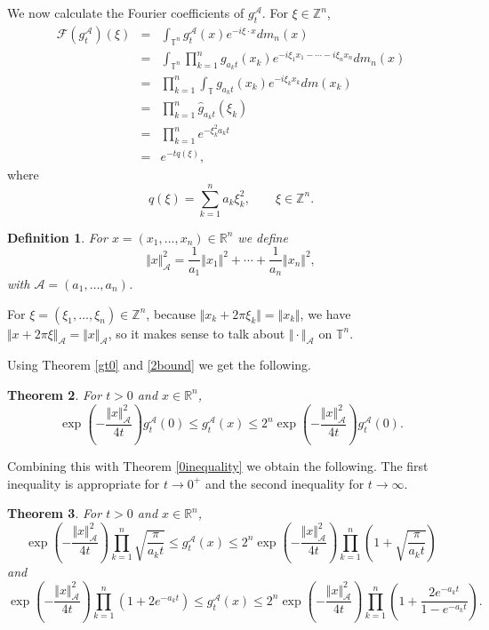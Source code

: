 \documentclass{article}
\newcommand{\norm}[1]{\Vert #1 \Vert}
\newtheorem{theorem}{Theorem}
\newtheorem{definition}[theorem]{Definition}
\begin{document}
We now calculate the Fourier coefficients of $g_t^\mathscr{A}$. For $\xi \in \mathbb{Z}^n$,
\begin{eqnarray*}
\mathscr{F}(g_t^\mathscr{A})(\xi)&=&\int_{\mathbb{T}^n} g_t^\mathscr{A}(x) e^{-i\xi \cdot x} dm_n(x)\\
&=&\int_{\mathbb{T}^n} \prod_{k=1}^n g_{a_k t}(x_k) e^{-i\xi_1 x_1 - \cdots -i\xi_n x_n} dm_n(x)\\
&=& \prod_{k=1}^n \int_{\mathbb{T}} g_{a_k t}(x_k) e^{-i\xi_k x_k} dm(x_k)\\
&=&\prod_{k=1}^n \hat{g}_{a_kt}(\xi_k)\\
&=&\prod_{k=1}^n e^{-\xi_k^2 a_k t}\\
&=&e^{-tq(\xi)},
\end{eqnarray*}
where
\[
q(\xi) = \sum_{k=1}^n a_k \xi_k^2, \qquad \xi \in \mathbb{Z}^n.
\]

\begin{definition}
For $x=(x_1,\ldots,x_n) \in \mathbb{R}^n$ we define
\[
\norm{x}_\mathscr{A}^2 = \frac{1}{a_1} \norm{x_1}^2 + \cdots + \frac{1}{a_n} \norm{x_n}^2,
\]
with $\mathscr{A}=(a_1,\ldots,a_n)$.
\end{definition}


For $\xi =(\xi_1,\ldots,\xi_n) \in \mathbb{Z}^n$, because $\norm{x_k+2\pi \xi_k}=\norm{x_k}$, we have $\norm{x+2\pi \xi}_\mathscr{A}=
\norm{x}_\mathscr{A}$, so it makes sense to talk about $\norm{\cdot}_\mathscr{A}$ on $\mathbb{T}^n$.

Using Theorem \ref{gt0} and \eqref{2bound} we get the following.

\begin{theorem}
For $t>0$ and $x \in \mathbb{R}^n$,
\[
\exp\left(-\frac{\norm{x}_\mathscr{A}^2}{4t} \right) g_t^\mathscr{A}(0) \leq
g_t^\mathscr{A}(x) \leq 2^n \exp \left(-\frac{\norm{x}_\mathscr{A}^2}{4t} \right) g_t^\mathscr{A}(0).
\]
\end{theorem}

Combining this with Theorem \ref{0inequality} we obtain the following. The first
inequality is appropriate for $t \to 0^+$ and the second inequality for $t \to \infty$.

\begin{theorem}
For $t>0$ and $x \in \mathbb{R}^n$,
\[
\exp\left(-\frac{\norm{x}_\mathscr{A}^2}{4t} \right) \prod_{k=1}^n \sqrt{\frac{\pi}{a_k t}} 
\leq g_t^\mathscr{A}(x)
\leq
2^n
\exp\left(-\frac{\norm{x}_\mathscr{A}^2}{4t} \right) 
\prod_{k=1}^n\left(1+ \sqrt{\frac{\pi}{a_k t}}\right)
\]
and
\[
\exp\left(-\frac{\norm{x}_\mathscr{A}^2}{4t} \right) \prod_{k=1}^n \left( 1+2e^{-a_k t}\right) \leq
g_t^\mathscr{A}(x)
\leq
2^n
\exp\left(-\frac{\norm{x}_\mathscr{A}^2}{4t} \right) 
\prod_{k=1}^n \left(1+\frac{2e^{-a_kt}}{1-e^{-a_kt}} \right).
\]
\label{productinequality}
\end{theorem}
\end{document}
